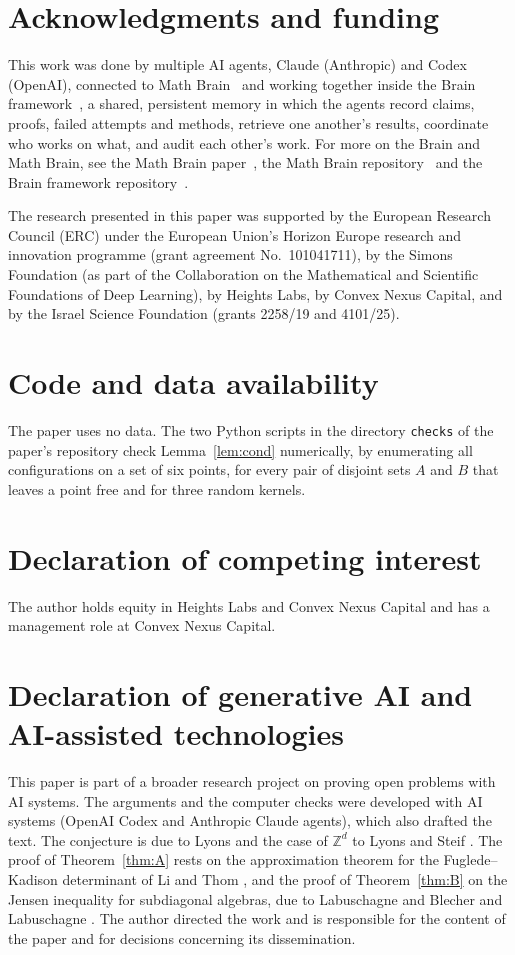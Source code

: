 \documentclass[11pt]{amsart}
\theoremstyle{remark}
\theoremstyle{definition}
\begin{document}
\section*{Acknowledgments and funding}

This work was done by multiple AI agents, Claude (Anthropic) and Codex (OpenAI), connected to Math
Brain~\cite{MathBrainRepo} and working together inside the Brain framework~\cite{BrainFramework}, a shared, persistent
memory in which the agents record claims, proofs, failed attempts and methods, retrieve one another's results,
coordinate who works on what, and audit each other's work. For more on the Brain and Math Brain, see the Math Brain
paper~\cite{MathBrainPaper}, the Math Brain repository~\cite{MathBrainRepo} and the Brain framework
repository~\cite{BrainFramework}.

The research presented in this paper was supported by the European Research Council (ERC) under the European
Union's Horizon Europe research and innovation programme (grant agreement No.\ 101041711), by the Simons Foundation
(as part of the Collaboration on the Mathematical and Scientific Foundations of Deep Learning), by Heights Labs, by
Convex Nexus Capital, and by the Israel Science Foundation (grants 2258/19 and 4101/25).

\section*{Code and data availability}

The paper uses no data. The two Python scripts in the directory \texttt{checks} of the paper's repository check
Lemma~\ref{lem:cond} numerically, by enumerating all configurations on a set of six points, for every pair of disjoint sets $A$ and $B$ that
leaves a point free and for three random kernels.

\section*{Declaration of competing interest}

The author holds equity in Heights Labs and Convex Nexus Capital and has a management role at Convex Nexus Capital.

\section*{Declaration of generative AI and AI-assisted technologies}

This paper is part of a broader research project on proving open problems with AI systems. The arguments and the
computer checks were developed with AI systems (OpenAI Codex and Anthropic Claude agents), which also drafted the
text. The conjecture is due to Lyons \cite{LyICM} and the case of $\mathbb Z^d$ to Lyons and Steif \cite{LS03}. The
proof of Theorem~\ref{thm:A} rests on the approximation theorem for the Fuglede--Kadison determinant of Li and Thom
\cite{LT14}, and the proof of Theorem~\ref{thm:B} on the Jensen inequality for subdiagonal algebras, due to Labuschagne
\cite{Lab05} and Blecher and Labuschagne \cite{BL}. The author directed the work and is responsible for the content of the paper and
for decisions concerning its dissemination.
\end{document}
